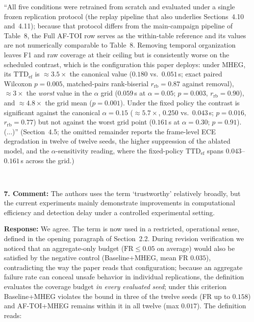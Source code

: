\documentclass[1p,12pt,authoryear]{elsarticle}
\begin{document}
``All five conditions were retrained from scratch and evaluated under a single frozen replication protocol (the replay pipeline that also underlies Sections~4.10 and~4.11); because that protocol differs from the main-campaign pipeline of Table~8, the Full AF-TOI row serves as the within-table reference and its values are not numerically comparable to Table~8. Removing temporal organization leaves F1 and raw coverage at their ceiling but is consistently worse on the scheduled contrast, which is the configuration this paper deploys: under MHEG, its $\mathrm{TTD}_{\mathrm{ef}}$ is ${\approx}3.5\times$ the canonical value ($0.180$ vs.\ $0.051$\,s; exact paired Wilcoxon $p=0.005$, matched-pairs rank-biserial $r_{\mathrm{rb}}=0.87$ against removal), ${\approx}3\times$ the \emph{worst} value in the $\alpha$ grid ($0.059$\,s at $\alpha=0.05$; $p=0.003$, $r_{\mathrm{rb}}=0.90$), and ${\approx}4.8\times$ the grid mean ($p=0.001$). Under the fixed policy the contrast is significant against the canonical $\alpha=0.15$ (${\approx}5.7\times$, $0.250$ vs.\ $0.043$\,s; $p=0.016$, $r_{\mathrm{rb}}=0.77$) but not against the worst grid point ($0.161$\,s at $\alpha=0.30$; $p=0.91$). (...)'' (Section~4.5; the omitted remainder reports the frame-level ECE degradation in twelve of twelve seeds, the higher suppression of the ablated model, and the $\alpha$-sensitivity reading, where the fixed-policy $\mathrm{TTD}_{\mathrm{ef}}$ spans $0.043$--$0.161$\,s across the grid.)

~

\noindent \textbf{7. Comment:} The authors uses the term `trustworthy' relatively broadly, but the current experiments mainly demonstrate improvements in computational efficiency and detection delay under a controlled experimental setting.

\vspace{2mm}
\noindent \textbf{Response:} We agree. The term is now used in a restricted, operational sense, defined in the opening paragraph of Section~2.2. During revision verification we noticed that an aggregate-only budget ($\mathrm{FR}\le 0.05$ on average) would also be satisfied by the negative control (Baseline+MHEG, mean FR $0.035$), contradicting the way the paper reads that configuration; because an aggregate failure rate can conceal unsafe behavior in individual replications, the definition evaluates the coverage budget \emph{in every evaluated seed}; under this criterion Baseline+MHEG violates the bound in three of the twelve seeds (FR up to $0.158$) and AF-TOI+MHEG remains within it in all twelve (max $0.017$). The definition reads:
\end{document}

